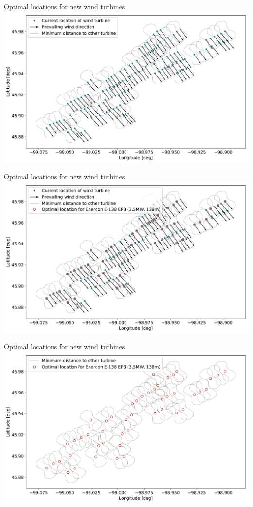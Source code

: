 \documentclass[color=usenames,dvipsnames]{beamer}
\begin{document}
    \begin{frame}{Optimal locations for new wind turbines}
        \includegraphics[width=\textwidth]{../../figures/optimized_cluster-2.pdf}
    \end{frame}

    \begin{frame}{Optimal locations for new wind turbines}
        \includegraphics[width=\textwidth]{../../figures/optimized_cluster-3.pdf}
    \end{frame}

    \begin{frame}{Optimal locations for new wind turbines}
        \includegraphics[width=\textwidth]{../../figures/optimized_cluster-4.pdf}
    \end{frame}
\end{document}
